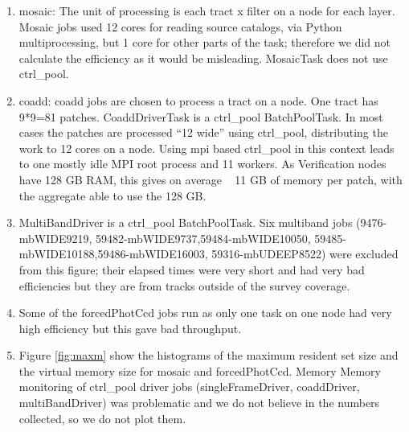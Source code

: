 \documentclass[DM,authoryear,toc]{lsstdoc}
\begin{document}
\begin{enumerate}
\item
mosaic: The unit of processing is each tract x filter on a node for each layer.  Mosaic jobs used 12 cores for reading source catalogs, via Python multiprocessing, but 1 core for other parts of the task; therefore we did not calculate the efficiency as it would be misleading. MosaicTask does not use ctrl{\_}pool.
\item
coadd: coadd jobs are chosen to process a tract on a node. One tract has 9*9=81 patches. CoaddDriverTask is a ctrl{\_}pool  BatchPoolTask. In most cases the patches are processed “12 wide” using ctrl{\_}pool, distributing the work to 12 cores on a node. Using mpi based ctrl{\_}pool in this context leads to one mostly idle MPI root process and 11 workers.  As Verification nodes have 128 GB RAM, this gives on average ~ 11 GB of memory per patch, with the aggregate  able to use the 128 GB.
\item
MultiBandDriver is a ctrl{\_}pool  BatchPoolTask.
Six multiband jobs (9476-mbWIDE9219, 59482-mbWIDE9737,59484-mbWIDE10050, 59485-mbWIDE10188,59486-mbWIDE16003, 59316-mbUDEEP8522) were excluded from this figure; their elapsed times were very short and had very bad efficiencies but they are from tracks outside of the survey coverage.
\item
Some of the forcedPhotCcd jobs run as only one task on one node had very high efficiency but this gave bad throughput.
\item
Figure \ref{fig:maxm} show the histograms of the maximum resident set size and the virtual memory size for mosaic and forcedPhotCcd. Memory Memory monitoring of ctrl{\_}pool driver jobs (singleFrameDriver, coaddDriver, multiBandDriver) was problematic and we do not believe in the numbers collected, so we do not plot them.


\end{enumerate}
\end{document}
